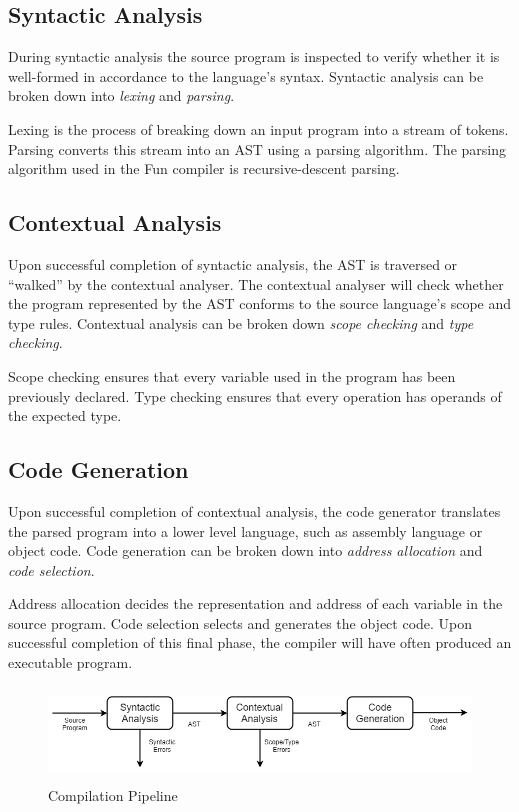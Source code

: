 \documentclass{l4proj}
\begin{document}
\subsection{Syntactic Analysis}
During syntactic analysis the source program is inspected to verify whether it is well-formed in accordance to the language's syntax. Syntactic analysis can be broken down into \textit{lexing} and \textit{parsing}.

Lexing is the process of breaking down an input program into a stream of tokens. Parsing converts this stream into an AST using a parsing algorithm. The parsing algorithm used in the Fun compiler is recursive-descent parsing.

\subsection{Contextual Analysis}
Upon successful completion of syntactic analysis, the AST is traversed or ``walked'' by the contextual analyser. The contextual analyser will check whether the program represented by the AST conforms to the source language's scope and type rules. Contextual analysis can be broken down \textit{scope checking} and \textit{type checking}.

Scope checking ensures that every variable used in the program has been previously declared. Type checking ensures that every operation has operands of the expected type.

\subsection{Code Generation}
Upon successful completion of contextual analysis, the code generator translates the parsed program into a lower level language, such as assembly language or object code. Code generation can be broken down into \textit{address allocation} and \textit{code selection}.

Address allocation decides the representation and address of each variable in the source program. Code selection selects and generates the object code. Upon successful completion of this final phase, the compiler will have often produced an executable program.

\begin{figure}[h]
\centering
\includegraphics[height=2.5cm,width=13cm]{images/3-2a.png}
\caption{Compilation Pipeline}
\label{fig:compilation-pipeline}	
\end{figure}
\end{document}
